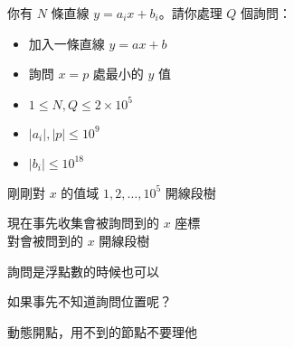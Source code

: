 \begin{frame}{}
    \begin{problem}
        你有 $N$ 條直線 $y = a_i x + b_i$。請你處理 $Q$ 個詢問：

        \begin{itemize}
            \item 加入一條直線 $y = ax + b$
            \item 詢問 $x = p$ 處最小的 $y$ 值
        \end{itemize}

        \begin{itemize}
            \item $1 \le N, Q \le 2 \times 10^5$
            \item $|a_i|, |p| \le 10^9$ 
            \item $|b_i| \le 10^{18}$
        \end{itemize}
    \end{problem}
\end{frame}

\begin{frame}{}
    剛剛對 $x$ 的值域 $1, 2, \dots, 10^5$ 開線段樹

    現在事先收集會被詢問到的 $x$ 座標 \\
    對會被問到的 $x$ 開線段樹

    詢問是浮點數的時候也可以
\end{frame}

\begin{frame}{}
    如果事先不知道詢問位置呢？

     {
        動態開點，用不到的節點不要理他
    }
\end{frame}

